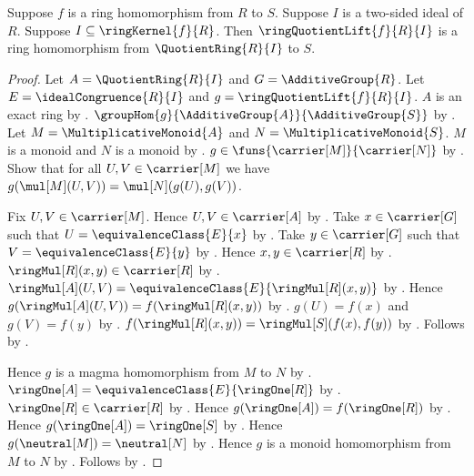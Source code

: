 \begin{theorem}\label{ring_quotient_lift_hom}
    Suppose $f$ is a ring homomorphism from $R$ to $S$.
    Suppose $I$ is a two-sided ideal of $R$.
    Suppose $I\subseteq\ringKernel{f}{R}$.
    Then $\ringQuotientLift{f}{R}{I}$ is a ring homomorphism from
        $\QuotientRing{R}{I}$ to $S$.
\end{theorem}
\begin{proof}
    Let $A=\QuotientRing{R}{I}$ and $G=\AdditiveGroup{R}$.
    Let $E=\idealCongruence{R}{I}$ and
        $g=\ringQuotientLift{f}{R}{I}$.
    $A$ is an exact ring by .
    $\groupHom{g}{\AdditiveGroup{A}}{\AdditiveGroup{S}}$ by
        .
    Let $M=\MultiplicativeMonoid{A}$ and
        $N=\MultiplicativeMonoid{S}$.
    $M$ is a monoid and $N$ is a monoid by
        .
    $g\in\funs{\carrier[M]}{\carrier[N]}$ by
        .
    Show that for all $U,V\in\carrier[M]$ we have
        $g(\mul[M](U,V))=\mul[N](g(U),g(V))$.
    \begin{subproof}
        Fix $U,V\in\carrier[M]$.
        Hence $U,V\in\carrier[A]$ by
            .
        Take $x\in\carrier[G]$ such that
            $U=\equivalenceClass{E}{x}$ by
            .
        Take $y\in\carrier[G]$ such that
            $V=\equivalenceClass{E}{y}$ by
            .
        Hence $x,y\in\carrier[R]$ by .
        $\ringMul[R](x,y)\in\carrier[R]$ by .
        $\ringMul[A](U,V)=
            \equivalenceClass{E}{\ringMul[R](x,y)}$ by
            .
        Hence $g(\ringMul[A](U,V))=f(\ringMul[R](x,y))$ by
            .
        $g(U)=f(x)$ and $g(V)=f(y)$ by
            .
        $f(\ringMul[R](x,y))=\ringMul[S](f(x),f(y))$ by
            .
        Follows by .
    \end{subproof}
    Hence $g$ is a magma homomorphism from $M$ to $N$ by
        .
    $\ringOne[A]=\equivalenceClass{E}{\ringOne[R]}$ by
        .
    $\ringOne[R]\in\carrier[R]$ by
        .
    Hence $g(\ringOne[A])=f(\ringOne[R])$ by
        .
    Hence $g(\ringOne[A])=\ringOne[S]$ by .
    Hence $g(\neutral[M])=\neutral[N]$ by
        .
    Hence $g$ is a monoid homomorphism from $M$ to $N$ by
        .
    Follows by .
\end{proof}

